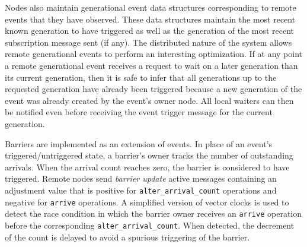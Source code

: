 Nodes also maintain generational event data structures corresponding to remote events that they have
observed.  These data structures maintain the most recent known generation to have triggered as well
as the generation of the most recent subscription message sent (if any).  The distributed nature
of the system allows remote generational events to perform an interesting optimization.  If at any point a
remote generational event receives a request to wait on a later generation than its current
generation,
then it is safe to infer that all generations up to the requested generation have already 
been triggered because a new generation of the event was already created by the event's owner node.
All local waiters can then be notified even before receiving the event trigger message for the current generation.

Barriers are implemented as an extension of events.  In place of an event's triggered/untriggered state,
a barrier's owner tracks the number of outstanding arrivals.  When the arrival count 
reaches zero, the barrier is considered to have triggered.  Remote nodes send {\em barrier update}
active messages containing an adjustment value that is positive for {\tt alter\_arrival\_count} operations 
and negative for {\tt arrive} operations.  A simplified version of vector clocks\cite{Fidge1998} is used
to detect the race condition in which the barrier owner receives an {\tt arrive} operation before the
corresponding {\tt alter\_arrival\_count}.  When detected, the decrement of the count 
is delayed to avoid a spurious triggering of the barrier.

